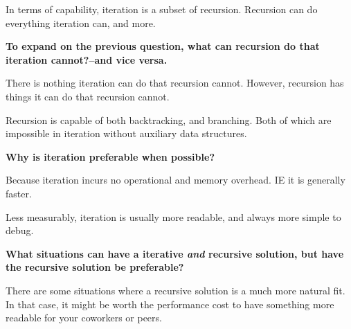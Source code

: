 \documentclass[12pt, letterpaper]{article}
\newcommand{\question}[1]{\textbf{#1}\par}
\newenvironment{answerblock}{\color{Green4}}{\normalcolor\vspace{1em}}
\begin{document}
\begin{answerblock}
In terms of capability, iteration is a subset of recursion. Recursion can do
everything iteration can, and more.
\end{answerblock}

\question{To expand on the previous question, what can recursion do that
iteration cannot?--and vice versa.}

\begin{answerblock}
There is nothing iteration can do that recursion cannot. However, recursion
has things it can do that recursion cannot.

Recursion is capable of both backtracking, and branching. Both of which are
impossible in iteration without auxiliary data structures. 
\end{answerblock}

\question{Why is iteration preferable when possible?}

\begin{answerblock}
Because iteration incurs no operational and memory overhead. IE it is
generally faster.

Less measurably, iteration is usually more readable, and always more simple to
debug.
\end{answerblock}

\question{What situations can have a iterative \textit{and} recursive solution,
but have the recursive solution be preferable?}

\begin{answerblock}
There are some situations where a recursive solution is a much more natural
fit. In that case, it might be worth the performance cost to have something
more readable for your coworkers or peers.
\end{answerblock}
\end{document}

